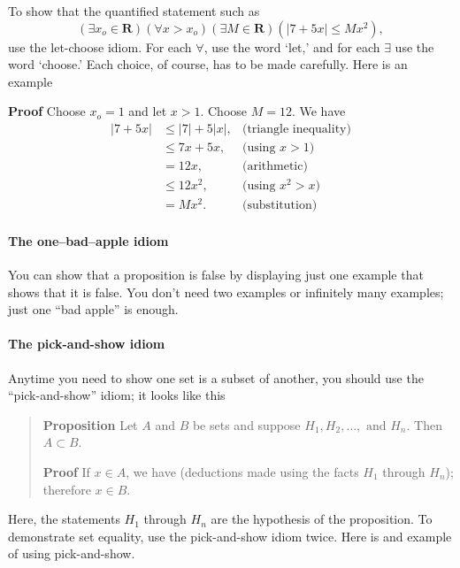 \documentclass[12pt,fleqn]{article}
\newcommand{\reals}{\mathbf{R}}
\newcounter{ex}\setcounter{ex}{0}
\newcounter{id}\setcounter{id}{0}
\newcounter{se}\setcounter{se}{0}
\begin{document}
To show that the quantified statement such as
\begin{equation*}
  \left(\exists x_o \in \reals \right) \left(\forall x > x_o\right) 
\left(\exists M \in \reals \right)  \left(|7 + 5 x| \leq M x^2\right),
\end{equation*}
use the let-choose idiom. For each \(\forall\), use the word `let,' and for each \(\exists\) use the word `choose.' 
Each choice, of course, has to be made carefully. Here is an example

\noindent \textbf{Proof} Choose \(x_o = 1\) and let \(x > 1\). Choose \(M = 12\).  We have
\begin{align*}
  |7 + 5 x| &\leq |7| + 5 |x|, &\mbox{(triangle inequality)} \\
            &\leq 7 x + 5 x,   &\mbox{(using } x > 1) \\
            &= 12 x,        &\mbox{(arithmetic)} \\
            &\leq 12 x^2,   &\mbox{(using } x^2 > x) \\
            &= M x^2.       &\mbox{(substitution)} 
\end{align*}



\paragraph{The one--bad--apple idiom}

You can show that a proposition is false by displaying just
one example that shows that it is false. You don't need two examples
or infinitely many examples; just one ``bad apple'' is enough.  





\paragraph{The pick-and-show idiom}

Anytime you need to show one set is a subset of another, you should use the
``pick-and-show'' idiom; it looks like this

\begin{quote}

\textbf{Proposition} Let \(A\) and \(B\) be sets and suppose \(H_1, H_2 , \dots
,\mbox{ and } H_n\). Then  \(A \subset B\).

\vspace{0.1in}

\textbf{Proof} If \(x \in A\), we have (deductions made using the 
facts \(H_1\) through \(H_n\)); therefore \(x \in B\).

\end{quote}
Here, the statements \(H_1\) through \(H_n\) are the hypothesis of the
proposition. To demonstrate set equality, use the pick-and-show idiom twice. Here
is and example of using pick-and-show.
\end{document}
